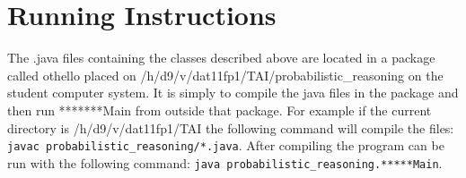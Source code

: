 \documentclass[a4paper]{article}
\begin{document}
\section{Running Instructions} The .java files containing the classes described
above are located in a package called othello placed on
/h/d9/v/dat11fp1/TAI/probabilistic\_reasoning on the student computer system. It
is simply to compile the java files in the package and then run *******Main from
outside that package. For example if the current directory is
/h/d9/v/dat11fp1/TAI the following command will compile the files: \texttt{javac
probabilistic\_reasoning/*.java}. After compiling the program can be run with
the following command: \texttt{java probabilistic\_reasoning.*****Main}.

\end{document}
